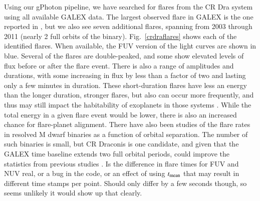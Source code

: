 \documentclass[5p]{elsarticle}
\begin{document}
Using our gPhoton pipeline, we have searched for flares from the CR Dra system using all available GALEX data.  The largest observed flare in GALEX is the one reported in \citet{wel2006}, but we also see seven additional flares, spanning from 2003 through 2011 (nearly 2 full orbits of the binary).  Fig.\ \ref{crdraflares} shows each of the identified flares.  When available, the FUV version of the light curves are shown in blue.  Several of the flares are double-peaked, and some show elevated levels of flux before or after the flare event.  There is also a range of amplitudes and durations, with some increasing in flux by less than a factor of two and lasting only a few minutes in duration.  These short-duration flares have less an energy than the longer duration, stronger flares, but also can occur more frequently, and thus may still impact the habitability of exoplanets in those systems \citep[e.g.,][]{ram2013}.  While the total energy in a given flare event would be lower, there is also an increased chance for flare-planet alignment.  There have also been studies of the flare rates in resolved M dwarf binaries as a function of orbital separation.  The number of such binaries is small, but CR Draconis is one candidate, and given that the GALEX time baseline extends two full orbital periods, could improve the statistics from previous studies \citep{tam2008}.  {\color{red}Is the difference in flare times for FUV and NUV real, or a bug in the code, or an effect of using $t_{\rm{mean}}$ that may result in different time stamps per point.  Should only differ by a few seconds though, so seems unlikely it would show up that clearly.}
\end{document}
